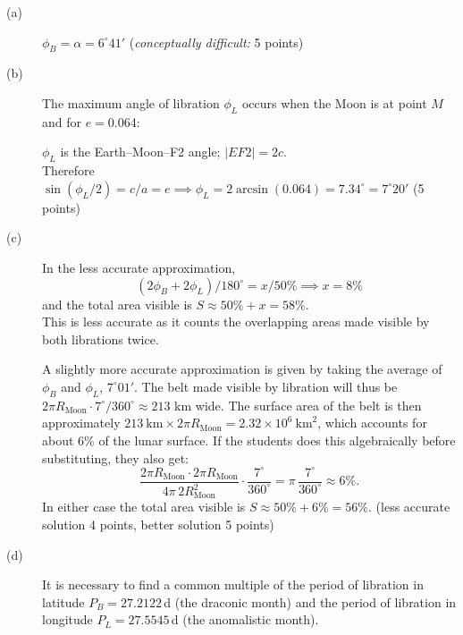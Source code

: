 \begin{description}
\item[(a)] $\phi_B = \alpha = 6^\circ 41'$
  \hfill(\textit{conceptually difficult:} 5 points)


\item[(b)] The maximum angle of libration $\phi_L$ occurs when the Moon is at
  point $M$ and for $e = 0.064$:


  $\phi_L$ is the Earth--Moon--F2 angle; $|EF2| = 2c$.\\
  Therefore
  $\sin(\phi_L/2) = c/a = e \implies
   \phi_L = 2\arcsin(0.064) = 7.34^\circ = 7^\circ 20'$
  \hfill(5 points)

\item[(c)] In the less accurate approximation,
  \[
    (2\phi_B + 2\phi_L)/180^\circ = x/50\% \implies x = 8\%
  \]
  and the total area visible is $S \approx 50\% + x = 58\%$.\\
  This is less accurate as it counts the overlapping areas made visible by both
  librations twice.

  A slightly more accurate approximation is given by taking the average of
  $\phi_B$ and $\phi_L$, $7^\circ 01'$. The belt made visible by libration will
  thus be $2\pi R_{\mathrm{Moon}} \cdot 7^\circ/360^\circ \approx 213$ km wide.
  The surface area of the belt is then approximately
  $213\ \mathrm{km} \times 2\pi R_{\mathrm{Moon}}
   = 2.32 \times 10^{6}\ \mathrm{km}^2$, which accounts for about 6\% of the
  lunar surface. If the students does this algebraically before substituting,
  they also get: %
  \[
    \frac{2\pi R_{\mathrm{Moon}} \cdot 2\pi R_{\mathrm{Moon}}}
         {4\pi \, 2 R_{\mathrm{Moon}}^2}
    \cdot \frac{7^\circ}{360^\circ}
    = \pi \, \frac{7^\circ}{360^\circ} \approx 6\%.
  \]
  In either case the total area visible is $S \approx 50\% + 6\% = 56\%$.
  \hfill(less accurate solution 4 points, better solution 5 points)

\item[(d)] It is necessary to find a common multiple of the period of libration
  in latitude $P_B = 27.2122$\,d (the draconic month) and the period of
  libration in longitude $P_L = 27.5545$\,d (the anomalistic month).


\end{description}
